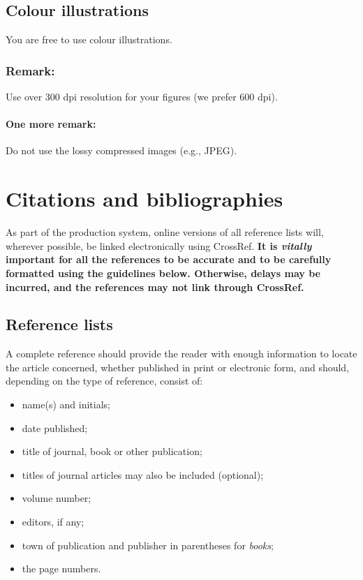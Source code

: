 \documentclass[a4paper]{jpconf}
\begin{document}
\subsection{Colour illustrations}
You are free to use colour illustrations. 
\subsubsection{Remark:}
Use over 300 dpi resolution for your figures (we prefer 600 dpi).
\paragraph{One more remark:}
Do not use the lossy compressed images (e.g., JPEG). 

\section{Citations and bibliographies}

As part of the \iopp{} production system, online versions of all reference lists will, wherever possible, be linked electronically using CrossRef. \textbf{It is \textit{vitally} important for all the references to be accurate and to be carefully formatted using the guidelines below. Otherwise, delays may be incurred, and the references may not link through CrossRef.}

\subsection{Reference lists}
A complete reference should provide the reader with enough information to locate the article concerned, whether published in print or electronic form, and should, depending on the type of reference, consist of:  

\begin{itemize}
\item name(s) and initials;
\item date published;
\item title of journal, book or other publication; 
\item titles of journal articles may also be included (optional);
\item volume number;
\item editors, if any;
\item town of publication and publisher in parentheses for {\it books};
\item the page numbers.
\end{itemize}
\end{document}

